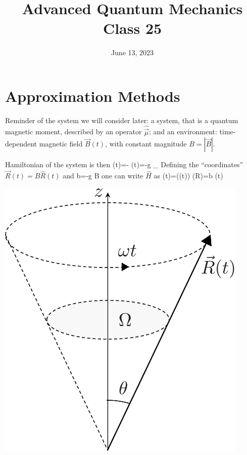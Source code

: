 \documentclass[12pt]{article}
\title{Advanced Quantum Mechanics\\Class 25}
\date{June 13, 2023}                                           %
\begin{document}
\maketitle

\setcounter{section}{4}

\section{Approximation Methods}

Reminder of the system we will consider later:
a system, that is a quantum magnetic moment,
 described by an operator $\hat{\vec{\mu}}$;
and an environment: time-dependent magnetic field
$\vec{B}(t)$, with constant magnitude $B=|\vec{B}|$.

\begin{minipage}{0.6\textwidth}
\setcounter{equation}{77}
Hamiltonian of the system is then
\be
{}(t)=-\hat{\vec{\mu}} \cdot {}(t)=-g _{}  \cdot {}
\ee	
Defining the ``coordinates'' $\vec{R}(t)=B \hat{R}(t)$ and
\be
b=-g  B
\ee
one can write $\hat{H}$ as
\be
{}(t)=((t)) \equiv {}(R)=b (t) \cdot {}
\label{eq:g80}
\ee
\end{minipage}%
\begin{minipage}{0.4\textwidth}
\hfill\includegraphics[width=0.9\textwidth]{Figures/RotatingVector-crop.pdf}
\end{minipage}
\end{document}

